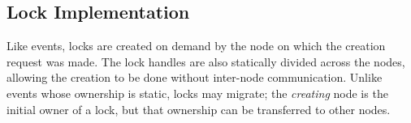 

\subsection{Lock Implementation}
\label{subsec:lockimpl}

Like events, locks are created on demand by the node on which the creation request was made.  The lock
handles are also statically divided across the nodes, allowing the creation to be done without inter-node
communication.  Unlike events whose ownership is static, locks may migrate; the {\em creating}
node is the initial owner of a lock, but that ownership can be transferred to other nodes.

